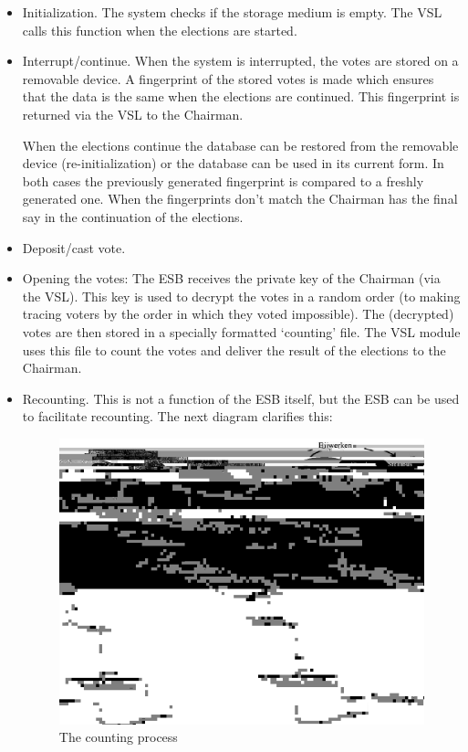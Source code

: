 \begin{itemize}
	\item Initialization. The system checks if the storage medium
	is empty. The VSL calls this function when the elections are
	started.

	\item Interrupt/continue. When the system is interrupted, the
	votes are stored on a removable device. A fingerprint of the
	stored votes is made which ensures that the data is the same
	when the elections are continued. This fingerprint is returned
	via the VSL to the Chairman.

	When the elections continue the database can be restored from
	the removable device (re-initialization) or the database can
	be used in its current form. In both cases the previously
	generated fingerprint is compared to a freshly generated
	one. When the fingerprints don't match the Chairman has the
	final say in the continuation of the elections.

	\item Deposit/cast vote.

	\item Opening the votes: The ESB receives the private key of
	the Chairman (via the VSL). This key is used to decrypt the
	votes in a random order (to making tracing voters by the order
	in which they voted impossible). The (decrypted) votes are
	then stored in a specially formatted `counting' file. The VSL
	module uses this file to count the votes and deliver the
	result of the elections to the Chairman. 

	\item Recounting. This is not a function of the ESB itself,
	but the ESB can be used to facilitate recounting. The next
	diagram clarifies this:\\
	\newpage

	\begin{figure}[H]
	\begin{center}
	\includegraphics[scale=0.4]{picts/counting.jpg}
	\end{center}
	\caption{The counting process\label{fig:counting-process}}
	\end{figure}
	

\end{itemize}
